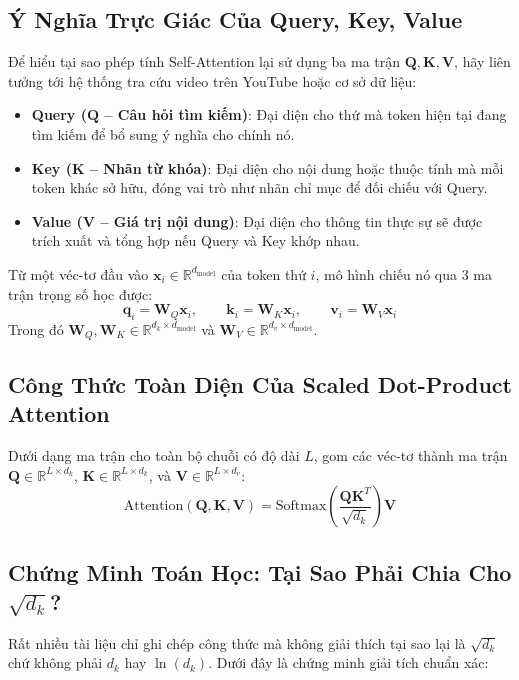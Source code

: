 \subsection{Ý Nghĩa Trực Giác Của Query, Key, Value}
Để hiểu tại sao phép tính Self-Attention lại sử dụng ba ma trận $\mathbf{Q}, \mathbf{K}, \mathbf{V}$, hãy liên tưởng tới hệ thống tra cứu video trên YouTube hoặc cơ sở dữ liệu:
\begin{itemize}
  \item \textbf{Query ($\mathbf{Q}$ -- Câu hỏi tìm kiếm)}: Đại diện cho thứ mà token hiện tại đang tìm kiếm để bổ sung ý nghĩa cho chính nó.
  \item \textbf{Key ($\mathbf{K}$ -- Nhãn từ khóa)}: Đại diện cho nội dung hoặc thuộc tính mà mỗi token khác sở hữu, đóng vai trò như nhãn chỉ mục để đối chiếu với Query.
  \item \textbf{Value ($\mathbf{V}$ -- Giá trị nội dung)}: Đại diện cho thông tin thực sự sẽ được trích xuất và tổng hợp nếu Query và Key khớp nhau.
\end{itemize}

Từ một véc-tơ đầu vào $\mathbf{x}_i \in \mathbb{R}^{d_{\text{model}}}$ của token thứ $i$, mô hình chiếu nó qua 3 ma trận trọng số học được:
\begin{equation}
\mathbf{q}_i = \mathbf{W}_Q \mathbf{x}_i, \qquad \mathbf{k}_i = \mathbf{W}_K \mathbf{x}_i, \qquad \mathbf{v}_i = \mathbf{W}_V \mathbf{x}_i
\end{equation}
Trong đó $\mathbf{W}_Q, \mathbf{W}_K \in \mathbb{R}^{d_k \times d_{\text{model}}}$ và $\mathbf{W}_V \in \mathbb{R}^{d_v \times d_{\text{model}}}$.

\subsection{Công Thức Toàn Diện Của Scaled Dot-Product Attention}
Dưới dạng ma trận cho toàn bộ chuỗi có độ dài $L$, gom các véc-tơ thành ma trận $\mathbf{Q} \in \mathbb{R}^{L \times d_k}$, $\mathbf{K} \in \mathbb{R}^{L \times d_k}$, và $\mathbf{V} \in \mathbb{R}^{L \times d_v}$:
\begin{equation}
\text{Attention}(\mathbf{Q}, \mathbf{K}, \mathbf{V}) = \text{Softmax}\left( \frac{\mathbf{Q} \mathbf{K}^T}{\sqrt{d_k}} \right) \mathbf{V}
\label{eq:scaled-dot-product-attention}
\end{equation}

\subsection{Chứng Minh Toán Học: Tại Sao Phải Chia Cho $\sqrt{d_k}$?}
Rất nhiều tài liệu chỉ ghi chép công thức mà không giải thích tại sao lại là $\sqrt{d_k}$ chứ không phải $d_k$ hay $\ln(d_k)$. Dưới đây là chứng minh giải tích chuẩn xác:

